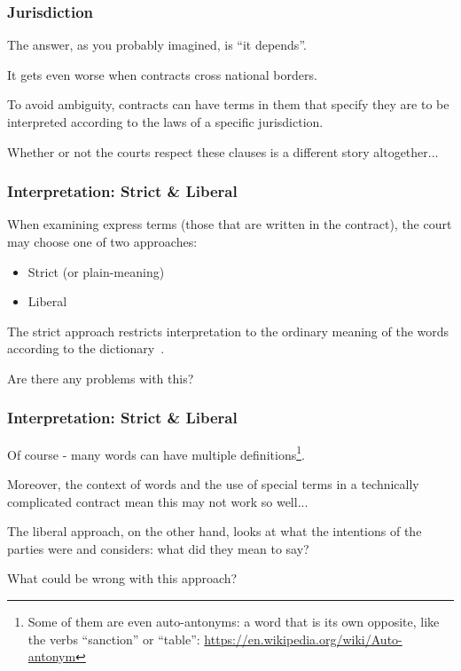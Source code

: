 \begin{frame}
\frametitle{Jurisdiction}

The answer, as you probably imagined, is ``it depends''.

It gets even worse when contracts cross national borders.

To avoid ambiguity, contracts can have terms in them that specify they are to be interpreted according to the laws of a specific jurisdiction.

Whether or not the courts respect these clauses is a different story altogether...


\end{frame}



\begin{frame}
\frametitle{Interpretation: Strict \& Liberal}

When examining \alert{express} terms (those that are written in the contract), the court may choose one of two approaches:

\begin{itemize}
	\item Strict (or plain-meaning)
	\item Liberal
\end{itemize}

The strict approach restricts interpretation to the ordinary meaning of the words according to the dictionary~\cite{lba}.

Are there any problems with this?

\end{frame}



\begin{frame}
\frametitle{Interpretation: Strict \& Liberal}

Of course - many words can have multiple definitions\footnote{Some of them are even auto-antonyms: a word that is its own opposite, like the verbs ``sanction'' or ``table'': \url{https://en.wikipedia.org/wiki/Auto-antonym}}.

Moreover, the context of words and the use of special terms in a technically complicated contract mean this may not work so well...

The liberal approach, on the other hand, looks at what the intentions of the parties were and considers: what did they mean to say?

What could be wrong with this approach?

\end{frame}




